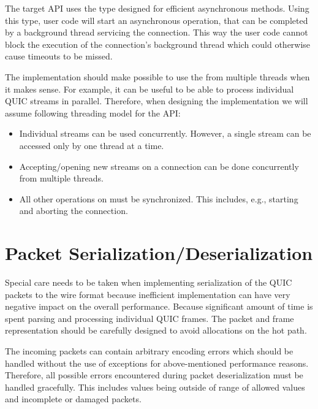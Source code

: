 The target API uses the  type designed for efficient asynchronous methods. Using
this type, user code will start an asynchronous operation, that can be completed by a background
thread servicing the connection. This way the user code cannot block the execution of the
connection's background thread which could otherwise cause timeouts to be missed.

The implementation should make possible to use the \QuicConnection{} from multiple threads when
it makes sense. For example, it can be useful to be able to process individual QUIC streams in
parallel. Therefore, when designing the implementation we will assume following threading model for
the API:

\begin{itemize}

  \item Individual streams can be used concurrently. However, a single stream can be
    accessed only by one thread at a time.

  \item Accepting/opening new streams on a connection can be done concurrently from multiple threads.

  \item All other operations on \QuicConnection{} must be synchronized. This includes, e.g.,
    starting and aborting the connection.

\end{itemize}

\section{Packet Serialization/Deserialization}

Special care needs to be taken when implementing serialization of the QUIC packets to the wire
format because inefficient implementation can have very negative impact on the overall performance.
Because significant amount of time is spent parsing and processing individual QUIC frames. The
packet and frame representation should be carefully designed to avoid allocations on the hot path.

The incoming packets can contain arbitrary encoding errors which should be handled without the use
of exceptions for above-mentioned performance reasons. Therefore, all possible errors encountered
during packet deserialization must be handled gracefully. This includes values being outside of
range of allowed values and incomplete or damaged packets.

